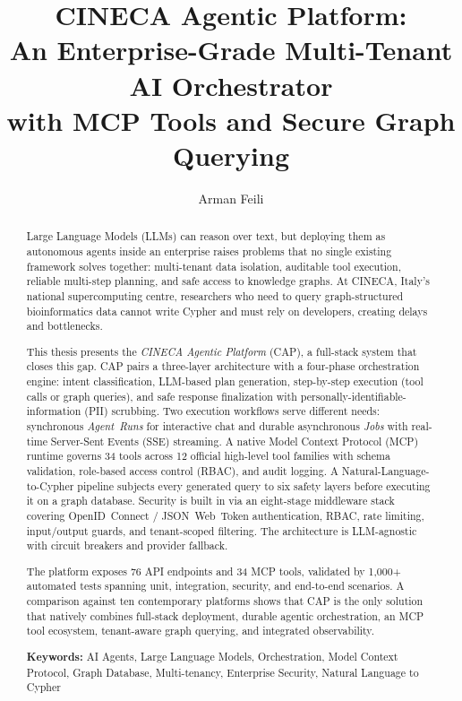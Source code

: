 \documentclass[a4paper,noexaminfo]{sapthesis}
\title{CINECA Agentic Platform:\\
       An Enterprise-Grade Multi-Tenant AI Orchestrator\\
       with MCP Tools and Secure Graph Querying}
\author{Arman Feili}
\newcommand{\ToolCount}{34}
\newcommand{\CategoryCount}{12}
\newcommand{\EndpointCount}{76}
\newcommand{\TestCount}{1,000+}
\begin{document}
\frontmatter

\maketitle

\begin{abstract}
    Large Language Models (LLMs) can reason over text, but deploying them as
    autonomous agents inside an enterprise raises problems that no single
    existing framework solves together: multi-tenant data isolation, auditable
    tool execution, reliable multi-step planning, and safe access to knowledge
    graphs.  At CINECA, Italy's national supercomputing centre, researchers
    who need to query graph-structured bioinformatics data cannot write Cypher
    and must rely on developers, creating delays and bottlenecks.

    This thesis presents the \emph{CINECA Agentic Platform} (CAP), a
    full-stack system that closes this gap.  CAP pairs a three-layer
    architecture with a four-phase orchestration engine: intent
    classification, LLM-based plan generation, step-by-step execution
    (tool calls or graph queries), and safe response finalization with
    personally-identifiable-information (PII) scrubbing.  Two execution
    workflows serve different needs: synchronous \emph{Agent~Runs} for
    interactive chat and durable asynchronous \emph{Jobs} with real-time
    Server-Sent Events (SSE) streaming.  A native Model Context Protocol
    (MCP) runtime governs \ToolCount{} tools across \CategoryCount{} official
    high-level tool families with schema validation, role-based access
    control (RBAC), and audit logging.
    A Natural-Language-to-Cypher pipeline subjects every generated query to
    six safety layers before executing it on a graph database.  Security is
    built in via an eight-stage middleware stack covering OpenID~Connect /
    JSON~Web~Token authentication, RBAC, rate limiting, input/output guards,
    and tenant-scoped filtering.  The architecture is LLM-agnostic with
    circuit breakers and provider fallback.

    The platform exposes \EndpointCount{} API endpoints and \ToolCount{} MCP
    tools, validated by \TestCount{} automated tests spanning unit,
    integration, security, and end-to-end scenarios.  A comparison against
    ten contemporary platforms shows that CAP is the only solution that
    natively combines full-stack deployment, durable agentic orchestration,
    an MCP tool ecosystem, tenant-aware graph querying, and integrated
    observability.

    \vspace{0.4cm}
    \noindent\textbf{Keywords:} AI Agents, Large Language Models,
    Orchestration, Model Context Protocol, Graph Database, Multi-tenancy,
    Enterprise Security, Natural Language to Cypher
\end{abstract}
\end{document}

